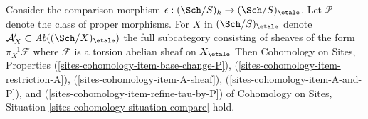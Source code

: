 \begin{lemma}
\label{lemma-compare-h-etale}
Consider the comparison morphism $\epsilon : (\Sch/S)_h \to (\Sch/S)_\etale$.
Let $\mathcal{P}$ denote the class of proper morphisms.
For $X$ in $(\Sch/S)_\etale$ denote
$\mathcal{A}'_X \subset \textit{Ab}((\Sch/X)_\etale)$
the full subcategory consisting of sheaves of the form
$\pi_X^{-1}\mathcal{F}$ where $\mathcal{F}$ is a
torsion abelian sheaf on $X_\etale$
Then Cohomology on Sites, Properties
(\ref{sites-cohomology-item-base-change-P}),
(\ref{sites-cohomology-item-restriction-A}),
(\ref{sites-cohomology-item-A-sheaf}),
(\ref{sites-cohomology-item-A-and-P}), and
(\ref{sites-cohomology-item-refine-tau-by-P})
of Cohomology on Sites, Situation
\ref{sites-cohomology-situation-compare} hold.
\end{lemma}

